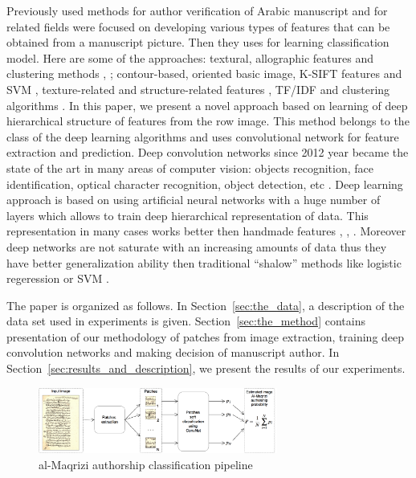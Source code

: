 \documentclass[conference,a4paper,twocolumn]{IEEEtran}
\begin{document}
Previously used methods for author verification of Arabic manuscript and for related fields were focused on developing various types of features that can be obtained from a manuscript picture. Then they uses for learning classification model. Here are some of the approaches: textural, allographic features and clustering methods \cite{MBulacu}, \cite{MBulacu1}; contour-based, oriented basic image, K-SIFT features and SVM \cite{DFecker}, texture-related and structure-related features \cite{Salvador}, TF/IDF and clustering algorithms \cite{Dunn}. In this paper, we present a novel approach based on learning of deep hierarchical structure of features from the row image. This method belongs to the class of the deep learning algorithms \cite{DL} and uses convolutional network \cite{CNN} for feature extraction and prediction. Deep convolution networks since 2012 year \cite{Alexnet} became the state of the art in many areas of computer vision: objects recognition, face identification, optical character recognition, object detection, etc \cite{DL}. Deep learning approach is based on using artificial neural networks with a huge number of layers which allows to train deep hierarchical representation of data. This representation in many cases works better then handmade features \cite{DL}, \cite{Alexnet}, \cite{Googlenet}. Moreover deep networks are not saturate with an increasing amounts of data thus they have better generalization ability then traditional ``shalow'' methods like logistic regeression or SVM \cite{DL}.   

The paper is organized as follows. In Section~\ref{sec:the_data}, a description of the data set used in experiments is given. Section~\ref{sec:the_method} contains presentation of our methodology of patches from image extraction, training deep convolution networks and making decision of manuscript author. In Section~\ref{sec:results_and_description}, we present the results of our experiments.
	

\begin{figure}[!t]
	\center
  \includegraphics[width=0.7\textwidth]{figures/Al-Maqrizi_classification_pipeline.png}
  \caption{al-Maqrizi authorship classification pipeline}
  \label{fig:pipeline}
\end{figure}	
	
\end{document}
